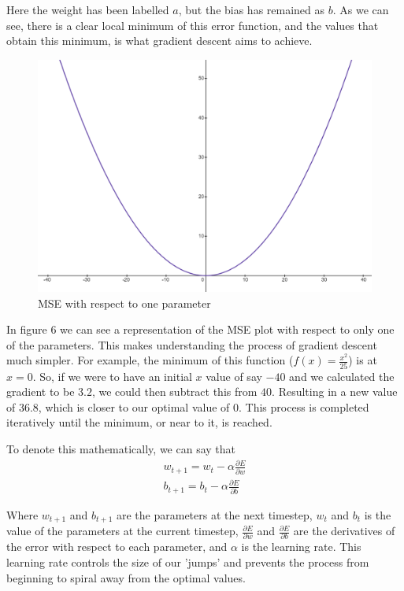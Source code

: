 \documentclass{article}
\begin{document}
    Here the weight has been labelled $a$, but the bias has remained as $b$. As we can see, there is a clear local minimum of this error function,
    and the values that obtain this minimum, is what gradient descent aims to achieve. 
    \begin{figure}
        \centering
        \includegraphics[scale=0.2]{image.png}
        \caption{MSE with respect to one parameter}
    \end{figure}

    In figure 6 we can see a representation of the MSE plot with respect to only one of the parameters. This makes understanding the process of gradient
    descent much simpler. For example, the minimum of this function ($f(x) = \frac{x^2}{25}$) is at $x = 0$. So, if we were to have an initial $x$ value of say $-40$
    and we calculated the gradient to be $3.2$, we could then subtract this from $40$. Resulting in a new value of $36.8$, which is closer to our optimal value of $0$.
    This process is completed iteratively until the minimum, or near to it, is reached.

    To denote this mathematically, we can say that 
    \begin{align}
        w_{t+1} = w_t - \alpha \frac{\partial E}{\partial w}\\
        b_{t+1} = b_t - \alpha \frac{\partial E}{\partial b}
    \end{align}

    Where $w_{t+1}$ and $b_{t+1}$ are the parameters at the next timestep, $w_t$ and $b_t$ is the value of the parameters at the current timestep, 
    $\frac{\partial E}{\partial w}$ and $\frac{\partial E}{\partial b}$ are the derivatives of the error with respect to each parameter, 
    and $\alpha$ is the learning rate. This learning rate controls the size of our 'jumps' and prevents the process from beginning to spiral away
    from the optimal values.
\end{document}
